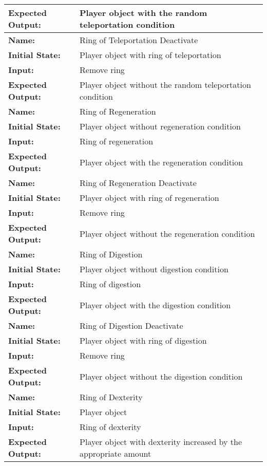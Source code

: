 \documentclass[12pt, titlepage]{article}
\begin{document}
\begin{center}
\begin{longtable}{ l | p{10cm} }
				\textbf{Expected Output:} & Player object with the random teleportation condition\\
				\hline
				\textbf{Name:} & Ring of Teleportation Deactivate\\
				\textbf{Initial State:} & Player object with ring of teleportation\\
				\textbf{Input:} & Remove ring\\
				\textbf{Expected Output:} & Player object without the random teleportation condition\\
				\hline
				\textbf{Name:} & Ring of Regeneration\\
				\textbf{Initial State:} & Player object without regeneration condition\\
				\textbf{Input:} & Ring of regeneration\\
				\textbf{Expected Output:} & Player object with the regeneration condition\\
				\hline
				\textbf{Name:} & Ring of Regeneration Deactivate\\
				\textbf{Initial State:} & Player object with ring of regeneration\\
				\textbf{Input:} & Remove ring\\
				\textbf{Expected Output:} & Player object without the regeneration condition\\
				\hline
				\textbf{Name:} & Ring of Digestion\\
				\textbf{Initial State:} & Player object without digestion condition\\
				\textbf{Input:} & Ring of digestion\\
				\textbf{Expected Output:} & Player object with the digestion condition\\
				\hline
				\textbf{Name:} & Ring of Digestion Deactivate\\
				\textbf{Initial State:} & Player object with ring of digestion\\
				\textbf{Input:} & Remove ring\\
				\textbf{Expected Output:} & Player object without the digestion condition\\
				\hline
				\textbf{Name:} & Ring of Dexterity\\
				\textbf{Initial State:} & Player object\\
				\textbf{Input:} & Ring of dexterity\\
				\textbf{Expected Output:} & Player object with dexterity increased by the appropriate amount\\

\end{longtable}
\end{center}
\end{document}

